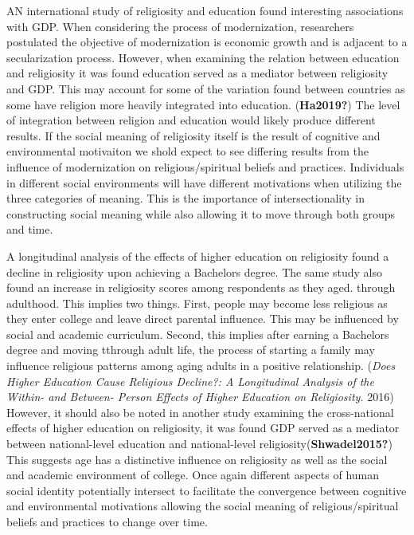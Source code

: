 \documentclass[
  12pt,
  letterpaper,
]{article}
\begin{document}
AN international study of religiosity and education found interesting
associations with GDP. When considering the process of modernization,
researchers postulated the objective of modernization is economic growth
and is adjacent to a secularization process. However, when examining the
relation between education and religiosity it was found education served
as a mediator between religiosity and GDP. This may account for some of
the variation found between countries as some have religion more heavily
integrated into education. (\textbf{Ha2019?}) The level of integration
between religion and education would likely produce different results.
If the social meaning of religiosity itself is the result of cognitive
and environmental motivaiton we shold expect to see differing results
from the influence of modernization on religious/spiritual beliefs and
practices. Individuals in different social environments will have
different motivations when utilizing the three categories of meaning.
This is the importance of intersectionality in constructing social
meaning while also allowing it to move through both groups and time.

A longitudinal analysis of the effects of higher education on
religiosity found a decline in religiosity upon achieving a Bachelors
degree. The same study also found an increase in religiosity scores
among respondents as they aged. through adulthood. This implies two
things. First, people may become less religious as they enter college
and leave direct parental influence. This may be influenced by social
and academic curriculum. Second, this implies after earning a Bachelors
degree and moving tthrough adult life, the process of starting a family
may influence religious patterns among aging adults in a positive
relationship. (\emph{Does Higher Education Cause Religious Decline?: A
Longitudinal Analysis of the Within- and Between- Person Effects of
Higher Education on Religiosity.} 2016) However, it should also be noted
in another study examining the cross-national effects of higher
education on religiosity, it was found GDP served as a mediator between
national-level education and national-level
religiosity(\textbf{Shwadel2015?}) This suggests age has a distinctive
influence on religiosity as well as the social and academic environment
of college. Once again different aspects of human social identity
potentially intersect to facilitate the convergence between cognitive
and environmental motivations allowing the social meaning of
religious/spiritual beliefs and practices to change over time.
\end{document}
